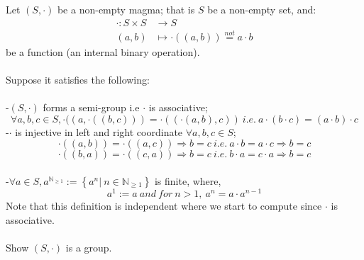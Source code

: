 \begin{problem}
    Let \( \left(S,\cdot\right) \) be a non-empty magma; that is \( S \) be a non-empty set, and:
    \begin{align*}
        \cdot:S\times S &\longrightarrow S\\
        (a,b) &\mapsto \cdot((a,b))\overset{not}{=}a\cdot b
    \end{align*}
    be a function (an internal binary operation).
    \\\\
    Suppose it satisfies the following:\\
    \\
    -\( \left(S,\cdot\right) \) forms a semi-group i.e \( \cdot \) is associative;
    \[
        \forall a,b,c\in S,\cdot(\left(a,\cdot\left(\left(b,c\right)\right)\right)=\cdot\left(\left(\cdot\left(a,b\right),c\right)\right)\ i.e.\ a\cdot\left(b\cdot c\right)=\left(a\cdot b\right)\cdot c
    \]
    -\( \cdot \) is injective in left and right coordinate \( \forall a,b,c\in S \);\\
    \[
        \cdot\left(\left(a,b\right)\right)=\cdot\left(\left(a,c\right)\right)\Rightarrow b=c\ i.e.\ a\cdot b=a\cdot c\Rightarrow b=c
    \]
    \[
        \cdot\left(\left(b,a\right)\right)=\cdot\left(\left(c,a\right)\right)\Rightarrow b=c\ i.e.\ b\cdot a=c\cdot a\Rightarrow b=c
    \]
    \\
    -\( \forall a\in S, a^{\mathbb{N}_{\geq 1}}:=\left\{a^n |\ n\in\mathbb{N}_{\geq 1}\right\} \) is finite, where,
    \[
        a^1:=a\ and\ for\ n>1,\ a^n=a\cdot a^{n-1}
    \]
    Note that this definition is independent where we start to compute since \( \cdot \) is associative.\\\\
    Show \( \left(S,\cdot\right) \) is a group.
\end{problem}
